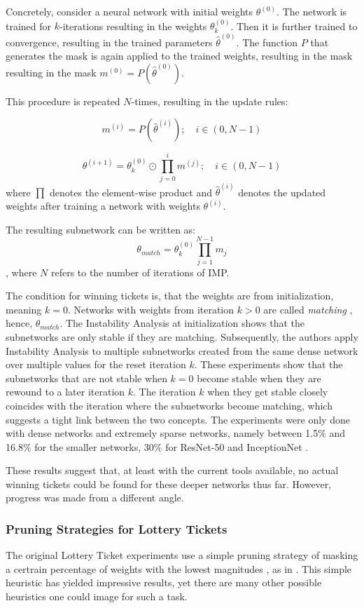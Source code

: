 Concretely, consider a neural network with initial weights $\theta^{(0)}$. The network is trained for $k$-iterations resulting in the weights $\theta_k^{(0)}$. Then it is further trained to convergence, resulting in the trained parameters $\hat \theta^{(0)}$.
The function $P$ that generates the mask is again applied to the trained weights, resulting in the mask resulting in the mask $m^{(0)} = \textit{P}(\hat \theta^{(0)})$.

This procedure is repeated $N$-times, resulting in the update rules:

$$
m^{(i)} = \textit{P}(\hat \theta^{(i)}); \quad i \in (0,N-1)
$$


$$\theta^{(i+1)} = \theta_k^{(0)} \odot \prod_{j=0}^{i}m^{(j)}; \quad i \in (0,N-1)$$ where $\prod$ denotes the element-wise product and $\hat \theta^{(i)}$ denotes the updated weights after training a network with weights $\theta^{(i)}$.

The resulting subnetwork can be written as:
$$
\theta_{match} = \theta_{k}^{(0)}\prod_{j=1}^{N-1}m_j
$$, where $N$ refers to the number of iterations of IMP.

The condition for winning tickets is, that the weights are from initialization, meaning $k=0$. 
Networks with weights from iteration $k > 0$ are called \textit{matching} \autocite{LinearModeConnectivity}, hence, $\theta_{match}$.
The Instability Analysis at initialization shows that the subnetworks are only stable if they are matching.
Subsequently, the authors apply Instability Analysis to multiple subnetworks created from the same dense network over multiple values for the reset iteration $k$.
These experiments show that the subnetworks that are not stable when $k=0$ become stable when they are rewound to a later iteration $k$.
The iteration $k$ when they get stable closely coincides with the iteration where the subnetworks become matching, which suggests a tight link between the two concepts.
The experiments were only done with dense networks and extremely sparse networks, namely between 1.5\% and 16.8\% for the smaller networks, 30\% for ResNet-50 and InceptionNet \autocite{LinearModeConnectivity}.

These results suggest that, at least with the current tools available, no actual winning tickets could be found for these deeper networks thus far.
However, progress was made from a different angle.

\subsubsection{Pruning Strategies for Lottery Tickets}
The original Lottery Ticket experiments use a simple pruning strategy of masking a certrain percentage of weights with the lowest magnitudes \autocite{DBLP:conf/iclr/FrankleC19}, as in \autocite{HanEtAl15}. This simple heuristic has yielded impressive results, yet there are many other possible heuristics one could image for such a task.

